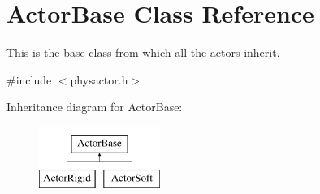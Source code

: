 \hypertarget{classActorBase}{
\section{ActorBase Class Reference}
\label{dd/d7b/classActorBase}
}


This is the base class from which all the actors inherit.  




{\ttfamily \#include $<$physactor.h$>$}

Inheritance diagram for ActorBase:\begin{figure}[H]
\begin{center}
\leavevmode
\includegraphics[height=2cm]{dd/d7b/classActorBase}
\end{center}
\end{figure}
